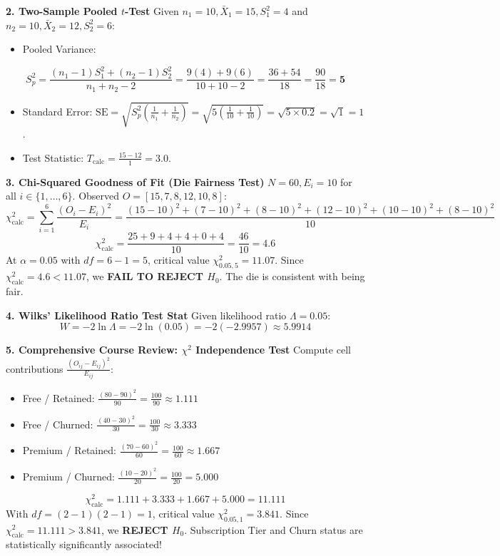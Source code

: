 \textbf{2. Two-Sample Pooled $t$-Test}
Given $n_1 = 10, \bar{X}_1 = 15, S_1^2 = 4$ and $n_2 = 10, \bar{X}_2 = 12, S_2^2 = 6$:
\begin{itemize}
    \item Pooled Variance:
\end{itemize}
$$S_p^2 = \frac{(n_1 - 1)S_1^2 + (n_2 - 1)S_2^2}{n_1 + n_2 - 2} = \frac{9(4) + 9(6)}{10 + 10 - 2} = \frac{36 + 54}{18} = \frac{90}{18} = \mathbf{5}$$
\begin{itemize}
    \item Standard Error: $\text{SE} = \sqrt{S_p^2 \left(\frac{1}{n_1} + \frac{1}{n_2}\right)} = \sqrt{5 \left(\frac{1}{10} + \frac{1}{10}\right)} = \sqrt{5 \times 0.2} = \sqrt{1} = 1$.
    \item Test Statistic: $T_{\text{calc}} = \frac{15 - 12}{1} = \mathbf{3.0}$.

\end{itemize}
\textbf{3. Chi-Squared Goodness of Fit (Die Fairness Test)}
$N = 60, E_i = 10$ for all $i \in \{1,\dots,6\}$. Observed $O = [15, 7, 8, 12, 10, 8]$:
$$\chi_{\text{calc}}^2 = \sum_{i=1}^6 \frac{(O_i - E_i)^2}{E_i} = \frac{(15-10)^2 + (7-10)^2 + (8-10)^2 + (12-10)^2 + (10-10)^2 + (8-10)^2}{10}$$
$$\chi_{\text{calc}}^2 = \frac{25 + 9 + 4 + 4 + 0 + 4}{10} = \frac{46}{10} = \mathbf{4.6}$$
At $\alpha = 0.05$ with $df = 6 - 1 = 5$, critical value $\chi_{0.05, 5}^2 = 11.07$.
Since $\chi_{\text{calc}}^2 = 4.6 < 11.07$, we \textbf{FAIL TO REJECT $H_0$}. The die is consistent with being fair.

\textbf{4. Wilks' Likelihood Ratio Test Stat}
Given likelihood ratio $\Lambda = 0.05$:
$$W = -2 \ln \Lambda = -2 \ln(0.05) = -2(-2.9957) \approx \mathbf{5.9914}$$

\textbf{5. Comprehensive Course Review: $\chi^2$ Independence Test}
Compute cell contributions $\frac{(O_{ij} - E_{ij})^2}{E_{ij}}$:
\begin{itemize}
    \item Free / Retained: $\frac{(80 - 90)^2}{90} = \frac{100}{90} \approx 1.111$
    \item Free / Churned: $\frac{(40 - 30)^2}{30} = \frac{100}{30} \approx 3.333$
    \item Premium / Retained: $\frac{(70 - 60)^2}{60} = \frac{100}{60} \approx 1.667$
    \item Premium / Churned: $\frac{(10 - 20)^2}{20} = \frac{100}{20} = 5.000$
\end{itemize}
$$\chi_{\text{calc}}^2 = 1.111 + 3.333 + 1.667 + 5.000 = \mathbf{11.111}$$
With $df = (2-1)(2-1) = 1$, critical value $\chi_{0.05, 1}^2 = 3.841$.
Since $\chi_{\text{calc}}^2 = 11.111 > 3.841$, we \textbf{REJECT $H_0$}. Subscription Tier and Churn status are statistically significantly associated!

